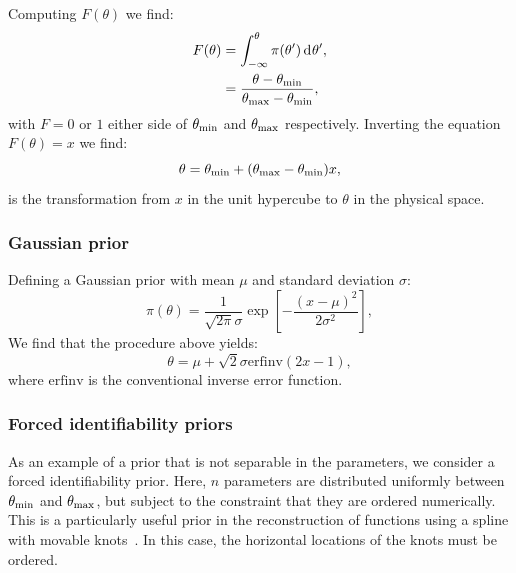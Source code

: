 Computing \(F(\theta)\) we find:
\begin{align}
  F(\theta) &= \int_{-\infty}^\theta \pi(\theta^\prime)\operatorname{d}^{}\!{\theta^\prime}, \nonumber\\
  &= \frac{\theta-\theta_{\mathrm{min}}}{\theta_{\mathrm{max}}-\theta_{\mathrm{min}}},
  \label{eqn:pc:calc_uniform_trans}
\end{align}
with \(F=0\) or \(1\) either side of \(\theta_{\mathrm{min}}\) and \(\theta_{\mathrm{max}}\) respectively. Inverting the equation \(F(\theta)=x\) we find:
\begin{equation}
  \theta = \theta_{\mathrm{min}}+(\theta_{\mathrm{max}}-\theta_{\mathrm{min}})x,
  \label{eqn:pc:uniform_trans}                           
\end{equation}
is the transformation from \(x\) in the unit hypercube to \(\theta\) in the physical space.

\subsubsection{Gaussian prior}
\label{sec:pc:gaussian_prior}
Defining a Gaussian prior with mean \(\mu\) and standard deviation \(\sigma\):
\begin{equation}
  \pi(\theta) = \frac{1}{\sqrt{2\pi}\sigma}\exp{\left[-\frac{{(x-\mu)}^2}{2\sigma^2}\right]},
  \label{eqn:pc:gaussian_prior}
\end{equation}
We find that the procedure above yields:
\begin{equation}
  \theta = \mu + \sqrt{2}\sigma\text{erfinv}(2x-1),
  \label{eqn:pc:gaussian_trans}                           
\end{equation}
where \(\text{erfinv}\) is the conventional inverse error function.




\subsubsection{Forced identifiability priors}
\label{sec:pc:forced_identifiablility}

As an example of a prior that is not separable in the parameters, we consider a forced identifiability prior. Here, \(n\) parameters are distributed uniformly between \(\theta_{\mathrm{min}}\) and \(\theta_{\mathrm{max}}\), but subject to the constraint that they are ordered numerically. This is a particularly useful prior in the reconstruction of functions using a spline with movable knots~\citep{vazquez_knots,knottedsky1,knottedsky2,planck2015-a24}. In this case, the  horizontal locations of the knots must be ordered.

